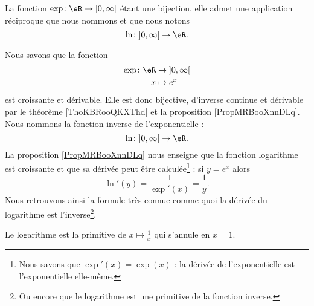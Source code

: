 \begin{definition}[Logarithme]  \label{DefDXPRooExiCpx}
    La fonction \( \exp\colon \eR\to \mathopen] 0 , \infty \mathclose[\) étant une bijection, elle admet une application réciproque que nous nommons  et que nous notons
\begin{equation}
    \ln\colon \mathopen] 0 , \infty \mathclose[\to \eR.
\end{equation}
\end{definition}

\begin{example}    \label{ExZLMooMzYqfK}
    Nous savons que la fonction
    \begin{equation}
        \begin{aligned}
        \exp\colon \eR&\to \mathopen] 0 , \infty \mathclose[ \\
            x&\mapsto e^x 
        \end{aligned}
    \end{equation}
    est croissante et dérivable. Elle est donc bijective, d'inverse continue et dérivable par le théorème \ref{ThoKBRooQKXThd} et la proposition \ref{PropMRBooXnnDLq}. Nous nommons  la fonction inverse de l'exponentielle :
    \begin{equation}
    \ln\colon \mathopen] 0 , \infty \mathclose[\to \eR.
    \end{equation}
    La proposition \ref{PropMRBooXnnDLq} nous enseigne que la fonction logarithme est croissante et que sa dérivée peut être calculée\footnote{Nous savons que \( \exp'(x)=\exp(x)\) : la dérivée de l'exponentielle est l'exponentielle elle-même.} : si \( y= e^{x}\) alors
    \begin{equation}
        \ln'(y)=\frac{1}{ \exp'(x) }=\frac{1}{ y }.
    \end{equation}
    Nous retrouvons ainsi la formule très connue comme quoi la dérivée du logarithme est l'inverse\footnote{Ou encore que le logarithme est une primitive de la fonction inverse.}.
\end{example}

\begin{lemma}
    Le logarithme est la primitive de \( x\mapsto\frac{1}{ x }\) qui s'annule en \( x=1\).
\end{lemma}

